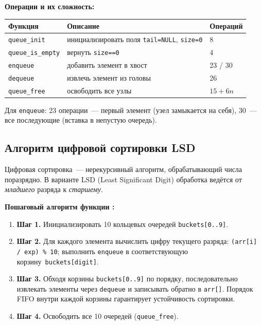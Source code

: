 \documentclass[a4paper,14pt]{extarticle}
\newcommand{\tcode}[1]{\code{#1}}
\begin{document}
\textbf{Операции и их сложность:}

\begin{center}
\begin{tabular}{|l|l|l|}
\hline
\textbf{Функция} & \textbf{Описание} & \textbf{Операций} \\
\hline
\texttt{queue\_init}      & инициализировать поля \texttt{tail=NULL}, \texttt{size=0} & 8 \\
\hline
\texttt{queue\_is\_empty} & вернуть \texttt{size==0}                                  & 4 \\
\hline
\texttt{enqueue}          & добавить элемент в хвост                                  & 23 / 30 \\
\hline
\texttt{dequeue}          & извлечь элемент из головы                                 & 26 \\
\hline
\texttt{queue\_free}      & освободить все узлы                                       & $15 + 6n$ \\
\hline
\end{tabular}
\end{center}

Для \texttt{enqueue}: 23 операции~--- первый элемент (узел замыкается на себя), 30~--- все последующие (вставка в непустую очередь).

\subsection{Алгоритм цифровой сортировки LSD}

Цифровая сортировка~--- нерекурсивный алгоритм, обрабатывающий числа поразрядно. В варианте LSD (Least Significant Digit) обработка ведётся от \textit{младшего} разряда к \textit{старшему}.

\textbf{Пошаговый алгоритм функции \tcode{counting_sort_by_queue}:}

\begin{enumerate}
  \item \textbf{Шаг 1.} Инициализировать 10 кольцевых очередей \texttt{buckets[0..9]}.
  \item \textbf{Шаг 2.} Для каждого элемента вычислить цифру текущего разряда: \texttt{(arr[i] / exp) \% 10}; выполнить \texttt{enqueue} в соответствующую корзину~\texttt{buckets[digit]}.
  \item \textbf{Шаг 3.} Обходя корзины \texttt{buckets[0..9]} по порядку, последовательно извлекать элементы через \texttt{dequeue} и записывать обратно в \texttt{arr[]}. Порядок FIFO внутри каждой корзины гарантирует устойчивость сортировки.
  \item \textbf{Шаг 4.} Освободить все 10 очередей (\texttt{queue\_free}).
\end{enumerate}
\end{document}
